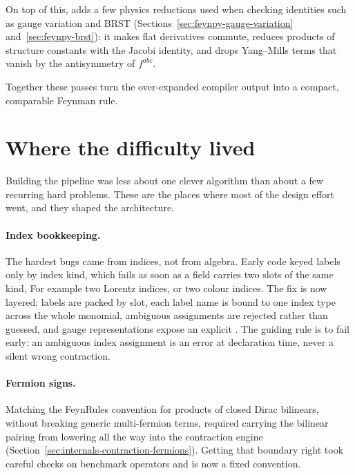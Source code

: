 On top of this,  adds a few physics reductions used when checking identities such as gauge variation and BRST (Sections~\ref{sec:feynpy-gauge-variation} and~\ref{sec:feynpy-brst}): it makes flat derivatives commute, reduces products of structure constants with the Jacobi identity, and drops Yang--Mills terms that vanish by the antisymmetry of $f^{abc}$.

Together these passes turn the over-expanded compiler output into a compact, comparable Feynman rule.

\section{Where the difficulty lived}
\label{sec:internals-difficulty}

Building the pipeline was less about one clever algorithm than about a few recurring hard problems. These are the places where most of the design effort went, and they shaped the architecture.

\paragraph{Index bookkeeping.} The hardest bugs came from indices, not from algebra. Early code keyed labels only by index kind, which fails as soon as a field carries two slots of the same kind, For example two Lorentz indices, or two colour indices. The fix is now layered: labels are packed by slot, each label name is bound to one index type across the whole monomial, ambiguous assignments are rejected rather than guessed, and gauge representations expose an explicit . The guiding rule is to fail early: an ambiguous index assignment is an error at declaration time, never a silent wrong contraction.

\paragraph{Fermion signs.} Matching the FeynRules convention for products of closed Dirac bilinears, without breaking generic multi-fermion terms, required carrying the bilinear pairing from lowering all the way into the contraction engine (Section~\ref{sec:internals-contraction-fermions}). Getting that boundary right took careful checks on benchmark operators and is now a fixed convention.



